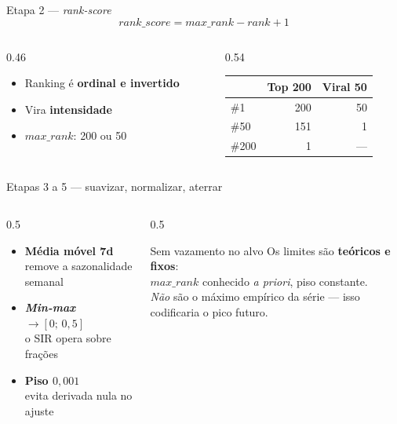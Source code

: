 \documentclass[aspectratio=169]{beamer}
\newcommand{\dest}[1]{\textcolor{ufprB}{\textbf{#1}}}
\newcommand{\azul}[1]{\textcolor{ufprA}{\textbf{#1}}}
\begin{document}
\begin{frame}{Etapa 2 --- \emph{rank-score}}
  \vfill
  \[ \textit{rank\_score} = \textit{max\_rank} - rank + 1 \]
  \vfill
  \begin{columns}[T]
  \begin{column}{0.46\textwidth}
    \begin{itemize}
      \item Ranking é \dest{ordinal e invertido}
      \item Vira \azul{intensidade}
      \item $\textit{max\_rank}$: 200 ou 50
    \end{itemize}
  \end{column}
  \begin{column}{0.54\textwidth}
    \begin{center}
    \begin{tabular}{lrr}
    \toprule
    & \textbf{Top 200} & \textbf{Viral 50} \\
    \midrule
    \#1   & 200 & 50 \\
    \#50  & 151 & 1 \\
    \#200 & 1   & --- \\
    \bottomrule
    \end{tabular}
    \end{center}
  \end{column}
  \end{columns}
  \vfill
\end{frame}

\begin{frame}{Etapas 3 a 5 --- suavizar, normalizar, aterrar}
  \begin{columns}[T]
  \begin{column}{0.5\textwidth}
    \vspace{0.5em}
    \begin{itemize}
      \item \azul{Média móvel 7d} \\ {\small remove a sazonalidade semanal}
      \item \azul{\emph{Min-max} $\rightarrow [0;\,0{,}5]$} \\ {\small o SIR opera sobre frações}
      \item \azul{Piso $0{,}001$} \\ {\small evita derivada nula no ajuste}
    \end{itemize}
  \end{column}
  \begin{column}{0.5\textwidth}
    \begin{alertblock}{Sem vazamento no alvo}
      Os limites são \dest{teóricos e fixos}:\\
      $\textit{max\_rank}$ conhecido \emph{a priori}, piso constante.\\[0.5em]
      \emph{Não} são o máximo empírico da série --- isso codificaria o pico futuro.
    \end{alertblock}
  \end{column}
  \end{columns}
\end{frame}
\end{document}

